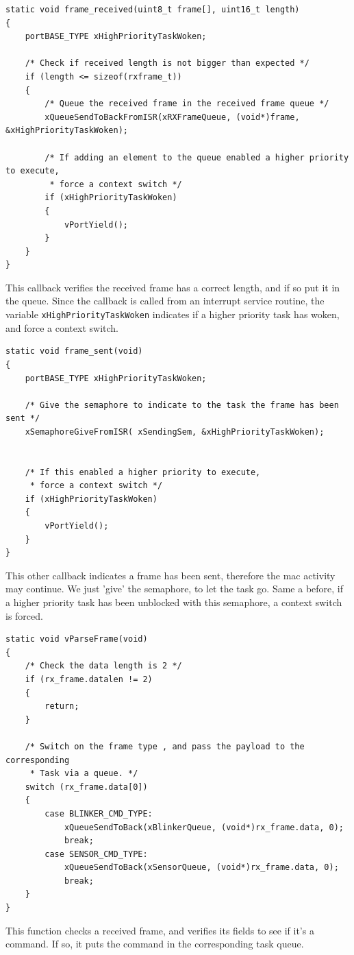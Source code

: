 \documentclass[11pt]{report}
\begin{document}
\begin{verbatim}
static void frame_received(uint8_t frame[], uint16_t length)
{
    portBASE_TYPE xHighPriorityTaskWoken;

    /* Check if received length is not bigger than expected */
    if (length <= sizeof(rxframe_t))
    {
        /* Queue the received frame in the received frame queue */
        xQueueSendToBackFromISR(xRXFrameQueue, (void*)frame, &xHighPriorityTaskWoken);

        /* If adding an element to the queue enabled a higher priority to execute,
         * force a context switch */
        if (xHighPriorityTaskWoken)
        {
            vPortYield();
        }
    }
}
\end{verbatim}
This callback verifies the received frame has a correct length, and if so put it in the queue. Since the callback is called from an interrupt service routine, the variable \verb$xHighPriorityTaskWoken$ indicates if a higher priority task has woken, and force a context switch.

\begin{verbatim}
static void frame_sent(void)
{
    portBASE_TYPE xHighPriorityTaskWoken;

    /* Give the semaphore to indicate to the task the frame has been sent */
    xSemaphoreGiveFromISR( xSendingSem, &xHighPriorityTaskWoken);


    /* If this enabled a higher priority to execute,
     * force a context switch */
    if (xHighPriorityTaskWoken)
    {
        vPortYield();
    }
}
\end{verbatim}
This other callback indicates a frame has been sent, therefore the mac activity may continue. We just 'give' the semaphore, to let the task go. Same a before, if a higher priority task has been unblocked with this semaphore, a context switch is forced.

\begin{verbatim}
static void vParseFrame(void)
{
    /* Check the data length is 2 */
    if (rx_frame.datalen != 2)
    {
        return;
    }

    /* Switch on the frame type , and pass the payload to the corresponding
     * Task via a queue. */
    switch (rx_frame.data[0])
    {
        case BLINKER_CMD_TYPE:
            xQueueSendToBack(xBlinkerQueue, (void*)rx_frame.data, 0);
            break;
        case SENSOR_CMD_TYPE:
            xQueueSendToBack(xSensorQueue, (void*)rx_frame.data, 0);
            break;
    }
}
\end{verbatim}
This function checks a received frame, and verifies its fields to see if it's a command. If so, it puts the command in the corresponding task queue.
\end{document}
